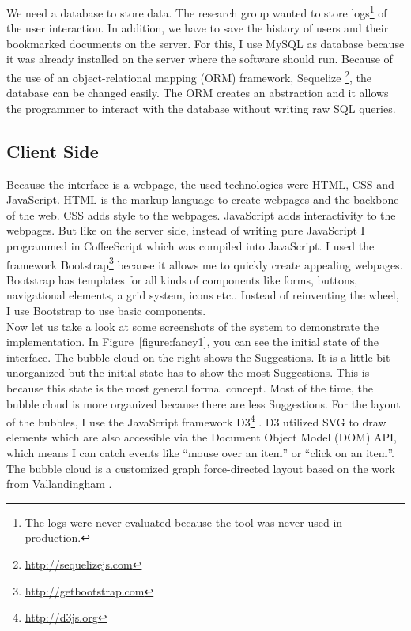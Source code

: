 \documentclass[11pt]{report}
\begin{document}
We need a database to store data. The research group wanted to store logs\footnote{The logs were never evaluated because the tool was never used in production.} of the user interaction. In addition, we have to save the history of users and their bookmarked documents on the server. For this, I use MySQL as database because it was already installed on the server where the software should run. Because of the use of an object-relational mapping (ORM) framework, Sequelize \footnote{\url{http://sequelizejs.com}}, the database can be changed easily. The ORM creates an abstraction and it allows the programmer to interact with the database without writing raw SQL queries.

\subsection{Client Side}

Because the interface is a webpage, the used technologies were HTML, CSS and JavaScript. HTML is the markup language to create webpages and the backbone of the web. CSS adds style to the webpages. JavaScript adds interactivity to the webpages. But like on the server side, instead of writing pure JavaScript I programmed in CoffeeScript which was compiled into JavaScript. I used the framework Bootstrap\footnote{\url{http://getbootstrap.com}} because it allows me to quickly create appealing webpages. Bootstrap has templates for all kinds of components like forms, buttons, navigational elements, a grid system, icons etc.. Instead of reinventing the wheel, I use Bootstrap to use basic components.\\

Now let us take a look at some screenshots of the system to demonstrate the implementation. In Figure~\ref{figure:fancy1}, you can see the initial state of the interface. The bubble cloud on the right shows the Suggestions. It is a little bit unorganized but the initial state has to show the most Suggestions. This is because this state is the most general formal concept. Most of the time, the bubble cloud is more organized because there are less Suggestions. For the layout of the bubbles, I use the JavaScript framework D3\footnote{\url{http://d3js.org}} \cite{Bostock2011}. D3 utilized SVG to draw elements which are also accessible via the Document Object Model (DOM) API, which means I can catch events like ``mouse over an item'' or ``click on an item''. The bubble cloud is a customized graph force-directed layout based on the work from Vallandingham \cite{Vallandingham}. \\
\end{document}
